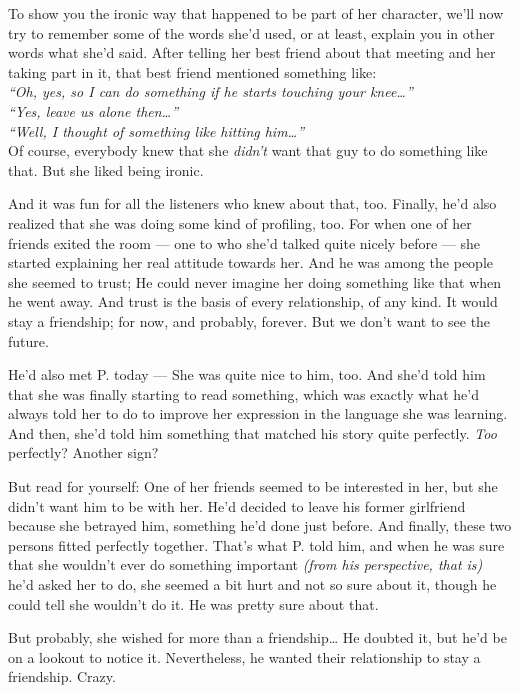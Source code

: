To show you the ironic way that happened to be part of her character, we'll now try to remember some of the words she'd used, or at least, explain you in other words what she'd said. 
After telling her best friend about that meeting and her taking part in it, that best friend mentioned something like:\\
\emph{\enquote{Oh, yes, so I can do something if he starts touching your knee\ldots}}\\
\emph{\enquote{Yes, leave us alone then\ldots}}\\
\emph{\enquote{Well, I thought of something like hitting him\ldots}}\\
Of course, everybody knew that she \emph{didn't} want that guy to do something like that. 
But she liked being ironic.

And it was fun for all the listeners who knew about that, too. 
Finally, he'd also realized that she was doing some kind of profiling, too. 
For when one of her friends exited the room --- one to who she'd talked quite nicely before --- she started explaining her real attitude towards her. 
And he was among the people she seemed to trust; He could never imagine her doing something like that when he went away. 
And trust is the basis of every relationship, of any kind. 
It would stay a friendship; for now, and probably, forever.
But we don't want to see the future.

He'd also met P. today --- She was quite nice to him, too. 
And she'd told him that she was finally starting to read something, which was exactly what he'd always told her to do to improve her expression in the language she was learning. 
And then, she'd told him something that matched his story quite perfectly. 
\emph{Too} perfectly?
Another sign?

But read for yourself:
One of her friends seemed to be interested in her, but she didn't want him to be with her. 
He'd decided to leave his former girlfriend because she betrayed him, something he'd done just before. 
And finally, these two persons fitted perfectly together. 
That's what P. told him, and when he was sure that she wouldn't ever do something important \emph{(from his perspective, that is)} he'd asked her to do, she seemed a bit hurt and not so sure about it, though he could tell she wouldn't do it.
He was pretty sure about that.

But probably, she wished for more than a friendship\ldots
He doubted it, but he'd be on a lookout to notice it. 
Nevertheless, he wanted their relationship to stay a friendship. 
Crazy.

